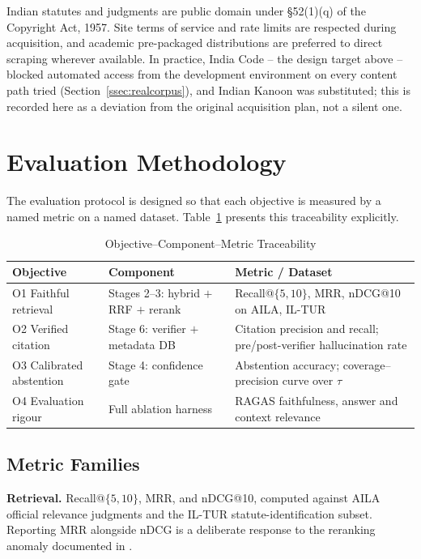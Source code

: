 \documentclass[conference]{IEEEtran}
\begin{document}
Indian statutes and judgments are public domain under \S52(1)(q) of the Copyright Act, 1957. Site terms of service and rate limits are respected during acquisition, and academic pre-packaged distributions are preferred to direct scraping wherever available. In practice, India Code -- the design target above -- blocked automated access from the development environment on every content path tried (Section~\ref{ssec:realcorpus}), and Indian Kanoon was substituted; this is recorded here as a deviation from the original acquisition plan, not a silent one.

\section{Evaluation Methodology}

The evaluation protocol is designed so that each objective is measured by a named metric on a named dataset. Table~\ref{tab:trace} presents this traceability explicitly.

\begin{table}[t]
\caption{Objective--Component--Metric Traceability}
\label{tab:trace}
\centering
\footnotesize
\begin{tabular}{@{}p{1.5cm}p{2.3cm}p{3.4cm}@{}}
\toprule
\textbf{Objective} & \textbf{Component} & \textbf{Metric / Dataset} \\
\midrule
O1 Faithful retrieval & Stages 2--3: hybrid $+$ RRF $+$ rerank & Recall@$\{5,10\}$, MRR, nDCG@10 on AILA, IL-TUR \\
\addlinespace
O2 Verified citation & Stage 6: verifier $+$ metadata DB & Citation precision and recall; pre/post-verifier hallucination rate \\
\addlinespace
O3 Calibrated abstention & Stage 4: confidence gate & Abstention accuracy; coverage--precision curve over $\tau$ \\
\addlinespace
O4 Evaluation rigour & Full ablation harness & RAGAS faithfulness, answer and context relevance \\
\bottomrule
\end{tabular}
\end{table}

\subsection{Metric Families}

\textbf{Retrieval.} Recall@$\{5,10\}$, MRR, and nDCG@10, computed against AILA official relevance judgments and the IL-TUR statute-identification subset. Reporting MRR alongside nDCG is a deliberate response to the reranking anomaly documented in \cite{rustamov2025}.
\end{document}
